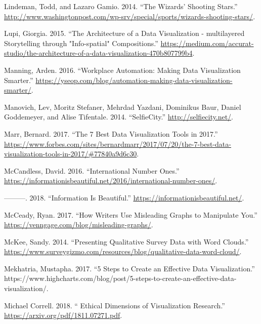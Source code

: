 \documentclass[]{book}
\begin{document}
\leavevmode\hypertarget{ref-basketball}{}%
Lindeman, Todd, and Lazaro Gamio. 2014. ``The Wizards' Shooting Stars.'' \url{http://www.washingtonpost.com/wp-srv/special/sports/wizards-shooting-stars/}.

\leavevmode\hypertarget{ref-Lupi}{}%
Lupi, Giorgia. 2015. ``The Architecture of a Data Visualization - multilayered Storytelling through "Info-spatial" Compositions.'' \url{https://medium.com/accurat-studio/the-architecture-of-a-data-visualization-470b807799b4}.

\leavevmode\hypertarget{ref-work_place}{}%
Manning, Arden. 2016. ``Workplace Automation: Making Data Visualization Smarter.'' \url{https://yseop.com/blog/automation-making-data-visualization-smarter/}.

\leavevmode\hypertarget{ref-selfie}{}%
Manovich, Lev, Moritz Stefaner, Mehrdad Yazdani, Dominikus Baur, Daniel Goddemeyer, and Alise Tifentale. 2014. ``SelfieCity.'' \url{http://selfiecity.net/}.

\leavevmode\hypertarget{ref-7_best_tools}{}%
Marr, Bernard. 2017. ``The 7 Best Data Visualization Tools in 2017.'' \url{https://www.forbes.com/sites/bernardmarr/2017/07/20/the-7-best-data-visualization-tools-in-2017/\#77840a9d6c30}.

\leavevmode\hypertarget{ref-country_chart}{}%
McCandless, David. 2016. ``International Number Ones.'' \url{https://informationisbeautiful.net/2016/international-number-ones/}.

\leavevmode\hypertarget{ref-info_beautiful}{}%
---------. 2018. ``Information Is Beautiful.'' \url{https://informationisbeautiful.net/}.

\leavevmode\hypertarget{ref-writers_manipulate}{}%
McCeady, Ryan. 2017. ``How Writers Use Misleading Graphs to Manipulate You.'' \url{https://venngage.com/blog/misleading-graphs/}.

\leavevmode\hypertarget{ref-wordcloud}{}%
McKee, Sandy. 2014. ``Presenting Qualitative Survey Data with Word Clouds.'' \url{https://www.surveygizmo.com/resources/blog/qualitative-data-word-cloud/}.

\leavevmode\hypertarget{ref-chart_audience}{}%
Mekhatria, Mustapha. 2017. ``5 Steps to Create an Effective Data Visualization.'' https://www.highcharts.com/blog/post/5-steps-to-create-an-effective-data-visualization/.

\leavevmode\hypertarget{ref-ethical_dim}{}%
Michael Correll. 2018. `` Ethical Dimensions of Visualization Research.'' \href{\%20https://arxiv.org/pdf/1811.07271.pdf}{https://arxiv.org/pdf/1811.07271.pdf}.
\end{document}
